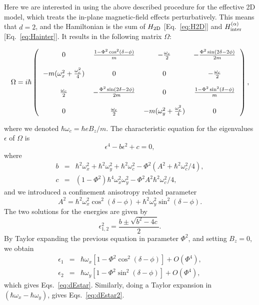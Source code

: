 \documentclass[aps,floatfix,twocolumn,showpacs,10pt,nofootinbib]{revtex4-1}
\newcommand{\be}{\begin{equation}}
\newcommand{\ee}{\end{equation}}
\begin{document}
Here we are interested in using the above described procedure for the effective 2D model, which treats the in-plane magnetic-field effects perturbatively. This means that $d=2$, and the Hamiltonian is the sum of $H_{\rm 2D}$ [Eq.~\eqref{eq:H2D}] and $H_{\rm inter}^{(\alpha)}$ [Eq.~\eqref{eq:Hainter}]. It results in the following matrix $\Omega$:
\begin{widetext}
\begin{equation}
\Omega=i \hbar \left(
\begin{tabular}{cccc}
0 & $\frac{1-\Phi^2 \cos^2(\delta-\phi)}{m}$ & $-\frac{\omega_c}{2}$ & $-\frac{\Phi^2\sin(2\delta-2\phi)}{2m}  $ \\\\
$- m (\omega_x^2 + \frac{\omega_c^2}{4})$ & 0 & 0 &  $-\frac{\omega_c}{2}$ \\\\
$\frac{\omega_c}{2}$ & $-\frac{\Phi^2\sin(2\delta-2\phi)}{2m}  $ & 0 & $\frac{1-\Phi^2 \sin^2(\delta-\phi)}{m}$   \\\\
0 & $\frac{\omega_c}{2}$ & $- m (\omega_y^2 + \frac{\omega_c^2}{4})$ & 0
\end{tabular}
\right),
\end{equation}
\end{widetext}
where we denoted $\hbar \omega_c = \hbar e B_z/m$. The characteristic equation for the eigenvalues $\epsilon$ of $\Omega$ is
\be
\epsilon^4 - b \epsilon^2 +c=0,
\ee
where
\begin{subequations}
\begin{eqnarray}
b &=& \hbar^2 \omega_x^2+\hbar^2 \omega_y^2+\hbar^2\omega_c^2-\Phi^2(A^2+\hbar^2 \omega_c^2/4),\\
c &=& (1-\Phi^2) \hbar^4 \omega_x^2 \omega_y^2 - \Phi^2 A^2 \hbar^2 \omega_c^2/4,
\end{eqnarray}
\end{subequations}
and we introduced a confinement anisotropy related parameter
\be
A^2 = \hbar^2 \omega_x^2 \cos^2(\delta-\phi) + \hbar^2 \omega_y^2 \sin^2(\delta-\phi).
\ee
The two solutions for the energies are given by
\be
\epsilon^2_{1,2} = \frac{b \pm \sqrt{b^2-4c}}{2}.
\ee
By Taylor expanding the previous equation in parameter $\Phi^2$, and setting $B_z=0$, we obtain
\begin{subequations}
\begin{eqnarray}
\epsilon_1 &=& \hbar \omega_x [1-\Phi^2 \cos^2(\delta-\phi)] + O(\Phi^{4}),\\
\epsilon_2 &=& \hbar \omega_y [1-\Phi^2 \sin^2(\delta-\phi)]+ O(\Phi^{4}),
\end{eqnarray}
\end{subequations}
which gives Eqs.~\eqref{eq:dEstar}. Similarly, doing a Taylor expansion in $(\hbar\omega_x-\hbar \omega_y)$, gives Eqs.~\eqref{eq:dEstar2}.
\end{document}

